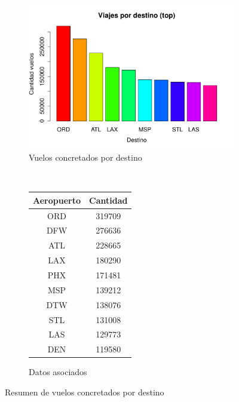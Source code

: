 \documentclass[12pt]{article}
\numberwithin{equation}{section}
\numberwithin{table}{section}
\numberwithin{figure}{section}
\begin{document}
\begin{figure}
        \centering
        ~
        \begin{subfigure}[b]{0.6\textwidth}
                \includegraphics[width=1\columnwidth]{imagenes/completos/viajes-por-destino-top}
                \caption{Vuelos concretados por destino}
        \end{subfigure}
        ~
        \begin{subfigure}[b]{0.3\textwidth}
\begin{tabular}{@{}cc@{}}
\toprule
\textbf{Aeropuerto} & \textbf{Cantidad} \\ \midrule
ORD                 & 319709            \\
DFW                 & 276636            \\
ATL                 & 228665            \\
LAX                 & 180290            \\
PHX                 & 171481            \\
MSP                 & 139212            \\
DTW                 & 138076            \\
STL                 & 131008            \\
LAS                 & 129773            \\
DEN                 & 119580            \\ \bottomrule
\end{tabular}
                \caption{Datos asociados}
        \end{subfigure}
        \caption{Resumen de vuelos concretados por destino}
        \label{fig:concretados-por-destino}
\end{figure}
\end{document}

